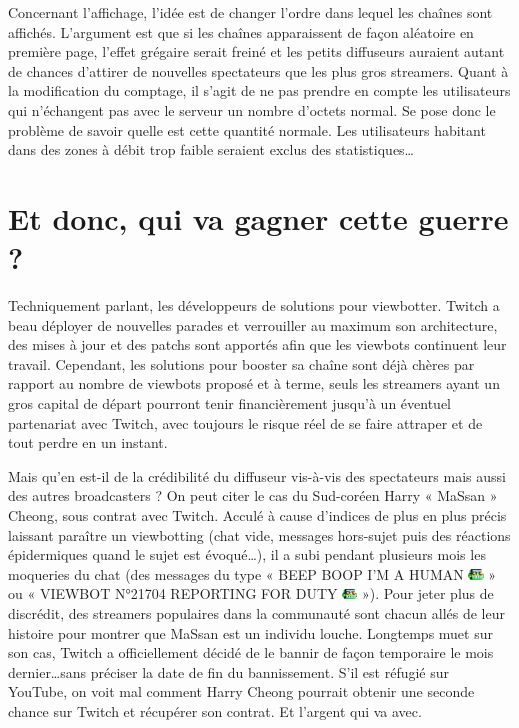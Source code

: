 \documentclass[a4paper]{article}
\begin{document}
Concernant l'affichage, l'idée est de changer l'ordre dans lequel les chaînes sont affichés. L'argument est que si les chaînes apparaissent de façon aléatoire en première page, l'effet grégaire serait freiné et les petits diffuseurs auraient autant de chances d'attirer de nouvelles spectateurs que les plus gros streamers. Quant à la modification du comptage, il s'agit de ne pas prendre en compte les utilisateurs qui n'échangent pas avec le serveur un nombre d'octets normal. Se pose donc le problème de savoir quelle est cette quantité normale. Les utilisateurs habitant dans des zones à débit trop faible seraient exclus des statistiques\ldots

\section{Et donc, qui va gagner cette guerre ?}

Techniquement parlant, les développeurs de solutions pour viewbotter. Twitch a beau déployer de nouvelles parades et verrouiller au maximum son architecture, des mises à jour et des patchs sont apportés afin que les viewbots continuent leur travail. Cependant, les solutions pour booster sa chaîne sont déjà chères par rapport au nombre de viewbots proposé et à terme, seuls les streamers ayant un gros capital de départ pourront tenir financièrement jusqu'à un éventuel partenariat avec Twitch, avec toujours le risque réel de se faire attraper et de tout perdre en un instant.

Mais qu'en est-il de la crédibilité du diffuseur vis-à-vis des spectateurs mais aussi des autres broadcasters ? On peut citer le cas du Sud-coréen Harry « MaSsan » Cheong, sous contrat avec Twitch. Acculé à cause d'indices de plus en plus précis laissant paraître un viewbotting (chat vide, messages hors-sujet puis des réactions épidermiques quand le sujet est évoqué\ldots), il a subi pendant plusieurs mois les moqueries du chat (des messages du type « BEEP BOOP I'M A HUMAN \includegraphics[width=0.4cm]{MrDestructoid.png} » ou « VIEWBOT N°21704 REPORTING FOR DUTY \includegraphics[width=0.4cm]{MrDestructoid.png} »). Pour jeter plus de discrédit, des streamers populaires dans la communauté sont chacun allés de leur histoire pour montrer que MaSsan est un individu louche. Longtemps muet sur son cas, Twitch a officiellement décidé de le bannir de façon temporaire le mois dernier\ldots sans préciser la date de fin du bannissement. S'il est réfugié sur YouTube, on voit mal comment Harry Cheong pourrait obtenir une seconde chance sur Twitch et récupérer son contrat. Et l'argent qui va avec.
\end{document}
